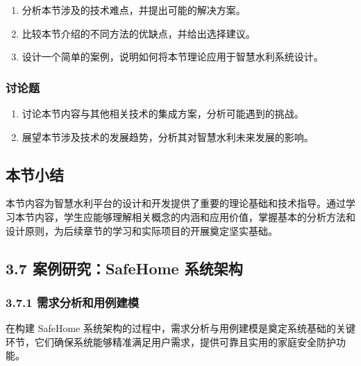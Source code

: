 \begin{enumerate}
\def\labelenumi{\arabic{enumi}.}
\tightlist
\item
  分析本节涉及的技术难点，并提出可能的解决方案。
\item
  比较本节介绍的不同方法的优缺点，并给出选择建议。
\item
  设计一个简单的案例，说明如何将本节理论应用于智慧水利系统设计。
\end{enumerate}

\hypertarget{ux8ba8ux8bbaux9898-2}{%
\subsubsection{讨论题}\label{ux8ba8ux8bbaux9898-2}}

\begin{enumerate}
\def\labelenumi{\arabic{enumi}.}
\tightlist
\item
  讨论本节内容与其他相关技术的集成方案，分析可能遇到的挑战。
\item
  展望本节涉及技术的发展趋势，分析其对智慧水利未来发展的影响。
\end{enumerate}

\hypertarget{ux672cux8282ux5c0fux7ed3-2}{%
\subsection{本节小结}\label{ux672cux8282ux5c0fux7ed3-2}}

本节内容为智慧水利平台的设计和开发提供了重要的理论基础和技术指导。通过学习本节内容，学生应能够理解相关概念的内涵和应用价值，掌握基本的分析方法和设计原则，为后续章节的学习和实际项目的开展奠定坚实基础。

\hypertarget{ux6848ux4f8bux7814ux7a76safehome-ux7cfbux7edfux67b6ux6784}{%
\subsection{3.7 案例研究：SafeHome 系统架构}\label{ux6848ux4f8bux7814ux7a76safehome-ux7cfbux7edfux67b6ux6784}}

\hypertarget{ux9700ux6c42ux5206ux6790ux548cux7528ux4f8bux5efaux6a21}{%
\subsubsection{3.7.1 需求分析和用例建模}\label{ux9700ux6c42ux5206ux6790ux548cux7528ux4f8bux5efaux6a21}}

在构建 SafeHome 系统架构的过程中，需求分析与用例建模是奠定系统基础的关键环节，它们确保系统能够精准满足用户需求，提供可靠且实用的家庭安全防护功能。

